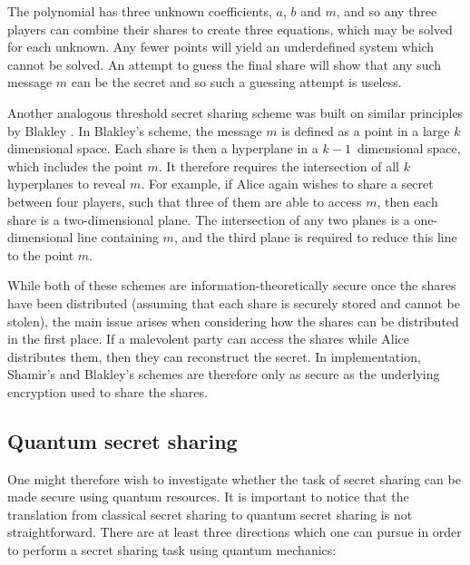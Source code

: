 The polynomial has three unknown coefficients, $a$, $b$ and $m$, and so any three players can combine their shares to create three equations, which may be solved for each unknown. Any fewer points will yield an underdefined system which cannot be solved. An attempt to guess the final share will show that any such message $m$ can be the secret and so such a guessing attempt is useless.

Another analogous threshold secret sharing scheme was built on similar principles by Blakley . In Blakley's scheme, the message $m$ is defined as a point in a large $k$ dimensional space. Each share is then a hyperplane in a $k-1$~dimensional space, which includes the point $m$. It therefore requires the intersection of all $k$ hyperplanes to reveal $m$. For example, if Alice again wishes to share a secret between four players, such that three of them are able to access $m$, then each share is a two-dimensional plane. The intersection of any two planes is a one-dimensional line containing $m$, and the third plane is required to reduce this line to the point $m$.

While both of these schemes are information-theoretically secure once the shares have been distributed (assuming that each share is securely stored and cannot be stolen), the main issue arises when considering how the shares can be distributed in the first place. If a malevolent party can access the shares while Alice distributes them, then they can reconstruct the secret. In implementation, Shamir's and Blakley's schemes are therefore only as secure as the underlying encryption used to share the shares.

%

\subsection{Quantum secret sharing}
One might therefore wish to investigate whether the task of secret sharing can be made secure using quantum resources. It is important to notice that the translation from classical secret sharing to quantum secret sharing is not straightforward. There are at least three directions which one can pursue in order to perform a secret sharing task using quantum mechanics:

